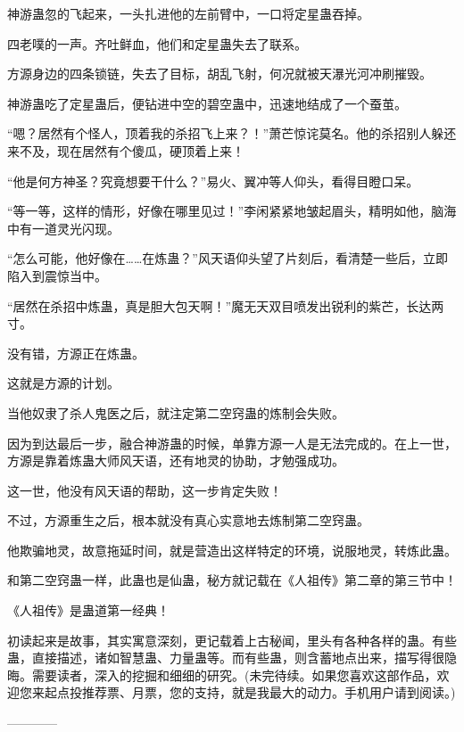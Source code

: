 \begin{this_body}
神游蛊忽的飞起来，一头扎进他的左前臂中，一口将定星蛊吞掉。

四老噗的一声。齐吐鲜血，他们和定星蛊失去了联系。

方源身边的四条锁链，失去了目标，胡乱飞射，何况就被天瀑光河冲刷摧毁。

神游蛊吃了定星蛊后，便钻进中空的碧空蛊中，迅速地结成了一个蚕茧。

“嗯？居然有个怪人，顶着我的杀招飞上来？！”萧芒惊诧莫名。他的杀招别人躲还来不及，现在居然有个傻瓜，硬顶着上来！

“他是何方神圣？究竟想要干什么？”易火、翼冲等人仰头，看得目瞪口呆。

“等一等，这样的情形，好像在哪里见过！”李闲紧紧地皱起眉头，精明如他，脑海中有一道灵光闪现。

“怎么可能，他好像在……在炼蛊？”风天语仰头望了片刻后，看清楚一些后，立即陷入到震惊当中。

“居然在杀招中炼蛊，真是胆大包天啊！”魔无天双目喷发出锐利的紫芒，长达两寸。

没有错，方源正在炼蛊。

这就是方源的计划。

当他奴隶了杀人鬼医之后，就注定第二空窍蛊的炼制会失败。

因为到达最后一步，融合神游蛊的时候，单靠方源一人是无法完成的。在上一世，方源是靠着炼蛊大师风天语，还有地灵的协助，才勉强成功。

这一世，他没有风天语的帮助，这一步肯定失败！

不过，方源重生之后，根本就没有真心实意地去炼制第二空窍蛊。

他欺骗地灵，故意拖延时间，就是营造出这样特定的环境，说服地灵，转炼此蛊。

和第二空窍蛊一样，此蛊也是仙蛊，秘方就记载在《人祖传》第二章的第三节中！

《人祖传》是蛊道第一经典！

初读起来是故事，其实寓意深刻，更记载着上古秘闻，里头有各种各样的蛊。有些蛊，直接描述，诸如智慧蛊、力量蛊等。而有些蛊，则含蓄地点出来，描写得很隐晦。需要读者，深入的挖掘和细细的研究。(未完待续。如果您喜欢这部作品，欢迎您来起点投推荐票、月票，您的支持，就是我最大的动力。手机用户请到阅读。)

------------

\end{this_body}

